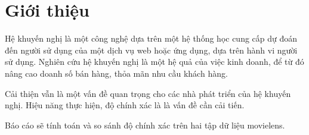 \chapter*{Giới thiệu}
\label{chap:Giới thiệu}

Hệ khuyến nghị là một công nghệ dựa trên một hệ thống học cung cấp dự đoán đến người sử dụng của một dịch vụ web hoặc ứng dụng, dựa trên hành vi người sử dụng. Nghiên cứu hệ khuyến nghị là một hệ quả của việc kinh doanh, để từ đó nâng cao doanh số bán hàng, thỏa mãn nhu cầu khách hàng. 

Cải thiện vẫn là một vấn đề quan trọng cho các nhà phát triển của hệ khuyến nghị. Hiệu năng thực hiện, độ chính xác là là vấn đề cần cải tiến. 

Báo cáo sẽ tính toán và so sánh độ chính xác trên hai tập dữ liệu movielens.

